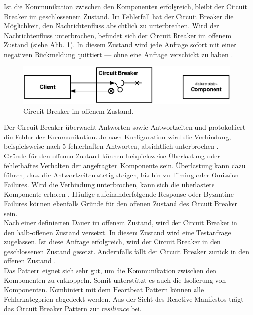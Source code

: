 Ist die Kommunikation zwischen den Komponenten erfolgreich, bleibt der Circuit Breaker im geschlossenem Zustand. Im Fehlerfall hat der Circuit Breaker die Möglichkeit, den Nachrichtenfluss absichtlich zu unterbrechen. Wird der Nachrichtenfluss unterbrochen, befindet sich der Circuit Breaker im offenem Zustand (siehe Abb. \ref{fig:circuit-breaker-open}). In diesem Zustand wird jede Anfrage sofort mit einer negativen Rückmeldung quittiert --- ohne eine Anfrage verschickt zu haben \cite[S.~94]{nygard_release_2007}.

\begin{figure}[H]
 \centering
 \includegraphics[width=1.0\textwidth]{4-Hauptteil/circuit-breaker/circuit-breaker-open.eps}
 \caption{Circuit Breaker im offenem Zustand.}
 \label{fig:circuit-breaker-open}
\end{figure}

Der Circuit Breaker überwacht Antworten sowie Antwortzeiten und protokolliert die Fehler der Kommunikation. Je nach Konfiguration wird die Verbindung, beispielsweise nach 5 fehlerhaften Antworten, absichtlich unterbrochen \cite[S.~94]{nygard_release_2007}.\\
Gründe für den offenen Zustand können beispielsweise Überlastung oder fehlerhaftes Verhalten der angefragten Komponente sein. Überlastung kann dazu führen, dass die Antwortzeiten stetig steigen, bis hin zu Timing oder Omission Failures. Wird die Verbindung unterbrochen, kann sich die überlastete Komponente erholen \cite[S.~203]{kuhn_reactive_2015}. Häufige aufeinanderfolgende Response oder Byzantine Failures können ebenfalls Gründe für den offenen Zustand des Circuit Breaker sein.\\
Nach einer definierten Dauer im offenem Zustand, wird der Circuit Breaker in den halb-offenen Zustand versetzt. In diesem Zustand wird eine Testanfrage zugelassen. Ist diese Anfrage erfolgreich, wird der Circuit Breaker in den geschlossenen Zustand gesetzt. Andernfalls fällt der Circuit Breaker zurück in den offenen Zustand \cite[S.~94]{nygard_release_2007}.\\

Das Pattern eignet sich sehr gut, um die Kommunikation zwischen den Komponenten zu entkoppeln. Somit unterstützt es auch die Isolierung von Komponenten. Kombiniert mit dem Heartbeat Pattern können alle Fehlerkategorien abgedeckt werden. Aus der Sicht des Reactive Manifestos trägt das Circuit Breaker Pattern zur \textit{resilience} bei.

